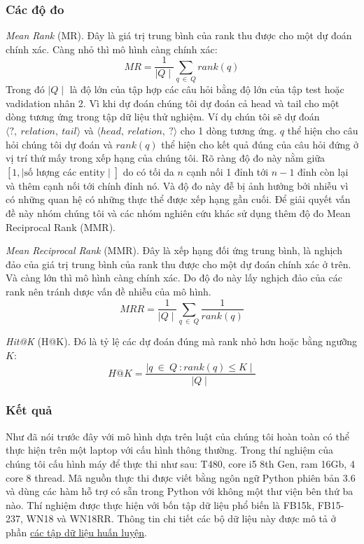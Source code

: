 \subsubsection{Các độ đo}
\textit{Mean Rank} (MR). Đây là giá trị trung bình của rank thu được cho một dự đoán chính xác. Càng nhỏ thì mô hình càng chính xác:
\[MR = \frac{1}{\mid Q \mid} \sum_{q ~\in~ Q} rank(q) \]
Trong đó \(\mid Q \mid\) là độ lớn của tập hợp các câu hỏi bằng độ lớn của tập test hoặc vadidation nhân 2. Vì khi dự đoán chúng tôi dự đoán cả head và tail cho một dòng tương ứng trong tập dữ liệu thử nghiệm. Ví dụ chún tôi sẽ dự đoán \(\langle ?,~ relation,~ tail \rangle\) và \(\langle head,~ relation,~ ?\rangle\) cho 1 dòng tương ứng. \(q\) thể hiện cho câu hỏi chúng tôi dự đoán và \(rank(q)\) thể hiện cho kết quả đúng của câu hỏi đứng ở vị trí thứ mấy trong xếp hạng của chúng tôi. Rõ ràng độ đo này nằm giữa \([1, \mid \text{số lượng các entity} \mid]\) do có tối da \(n\) cạnh nối 1 đỉnh tới \(n-1\) đỉnh còn lại và thêm cạnh nối tới chính đỉnh nó. Và độ đo này đễ bị ảnh hưởng bởi nhiễu vì có những quan hệ có những thực thể được xếp hạng gần cuối. Để giải quyết vấn đề này nhóm chúng tôi và các nhóm nghiên cứu khác sử dụng thêm độ đo Mean Reciprocal Rank (MMR).

\textit{Mean Reciprocal Rank} (MMR). Đây là xếp hạng đối ứng trung bình, là nghịch đảo của giá trị trung bình của rank thu được cho một dự đoán chính xác ở trên. Và càng lớn thì mô hình càng chính xác. Do độ đo này lấy nghịch đảo của các rank nên tránh dược vấn đề nhiễu của mô hình.
\[MRR =\frac{1}{\mid Q \mid} \sum_{q~ \in ~Q} \frac{1}{rank(q)}\]

\textit{Hit@K} (H@K). Đó là tỷ lệ các dự đoán đúng mà rank nhỏ hơn hoặc bằng ngưỡng \(K\):
\[H@K = \frac{\mid {q ~\in ~Q~: rank(q) \leq K} \mid}{\mid Q \mid}\]
\subsubsection{Kết quả}
Như đã nói trước đây với mô hình dựa trên luật của chúng tôi hoàn toàn có thể thực hiện trên một laptop với cấu hình thông thường. Trong thí nghiệm của chúng tôi cấu hình máy để thực thi như sau: T480, core i5 8th Gen, ram 16Gb, 4 core 8 thread. Mã nguồn thực thi được viết bằng ngôn ngữ Python phiên bản 3.6 và dùng các hàm hỗ trợ có sẵn trong Python với không một thư viện bên thứ ba nào. Thí nghiệm được thực hiện với bốn tập dữ liệu phổ biến là FB15k, FB15-237, WN18 và WN18RR. Thông tin chi tiết các bộ dữ liệu này được mô tả ở phần \hyperref[datasets]{các tập dữ liệu huấn luyện}.

